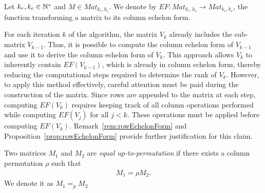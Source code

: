 \documentclass[11pt]{llncs}
\begin{document}
\begin{definition}
    Let $k_r,k_c\in \mathbb{N}^*$ and $M \in Mat_{k_r,k_c}$.
    We denote by $EF: Mat_{k_r,k_c} \rightarrow Mat_{k_r,k_c}$, the function transforming a matrix to its column echelon form.    
\end{definition}




For each iteration \( k \) of the algorithm, the matrix \( V_k \) already includes the sub-matrix \( V_{k-1} \). Thus, it is possible to compute the column echelon form of \( V_{k-1} \) and use it to derive the column echelon form of \( V_k \). 
This approach allows \( V_k \) to inherently contain \( EF(V_{k-1}) \), which is already in column echelon form, thereby reducing the computational steps required to determine the rank of \( V_k \).
However, to apply this method effectively, careful attention must be paid during the construction of the matrix. 
Since rows are appended to the matrix at each step, computing \( EF(V_k) \) requires keeping track of all column operations performed while computing \( EF(V_j) \) for all \( j < k \). 
These operations must be applied before computing \( EF(V_k) \).
Remark~\ref{rem:rowEchelonForm} and Proposition~\ref{prop:rowEchelonForm} provide further justification for this claim.


\begin{definition}
   Two matrices $M_1$ and $M_2$ are \textit{equal up-to-permutation} if there exists a column permutation $\rho$ such that
    \begin{align*}
        M_1 = \rho M_2.
    \end{align*}
    We denote it as $M_1 =_p M_2$
\end{definition}
\end{document}
